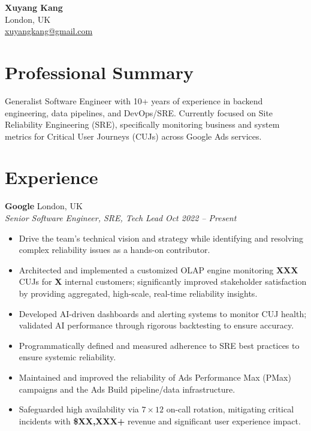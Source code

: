 \documentclass[10pt,a4paper]{article}
\newcommand{\entry}[4]{
  \textbf{#1} \hfill #2 \\
  \textit{#3} \hfill \textit{#4}
}
\begin{document}
\begin{center}
    {\Huge \textbf{Xuyang Kang}} \\ \vspace{4pt}
    London, UK \\ \vspace{2pt}
    \href{mailto:xuyangkang@gmail.com}{xuyangkang@gmail.com}
\end{center}

\section{Professional Summary}
Generalist Software Engineer with 10+ years of experience in backend engineering, data pipelines, and DevOps/SRE. Currently focused on Site Reliability Engineering (SRE), specifically monitoring business and system metrics for Critical User Journeys (CUJs) across Google Ads services.

\section{Experience}

\entry{Google}{London, UK}{Senior Software Engineer, SRE, Tech Lead}{Oct 2022 -- Present}
\begin{itemize}[noitemsep, leftmargin=*]
    \item Drive the team's technical vision and strategy while identifying and resolving complex reliability issues as a hands-on contributor.
    \item Architected and implemented a customized OLAP engine monitoring \textbf{XXX} CUJs for \textbf{X} internal customers; significantly improved stakeholder satisfaction by providing aggregated, high-scale, real-time reliability insights.
    \item Developed AI-driven dashboards and alerting systems to monitor CUJ health; validated AI performance through rigorous backtesting to ensure accuracy.
    \item Programmatically defined and measured adherence to SRE best practices to ensure systemic reliability.
    \item Maintained and improved the reliability of Ads Performance Max (PMax) campaigns and the Ads Build pipeline/data infrastructure.
    \item Safeguarded high availability via $7\times12$ on-call rotation, mitigating critical incidents with \textbf{\$XX,XXX+} revenue and significant user experience impact.
\end{itemize}
\vspace{6pt}
\end{document}
